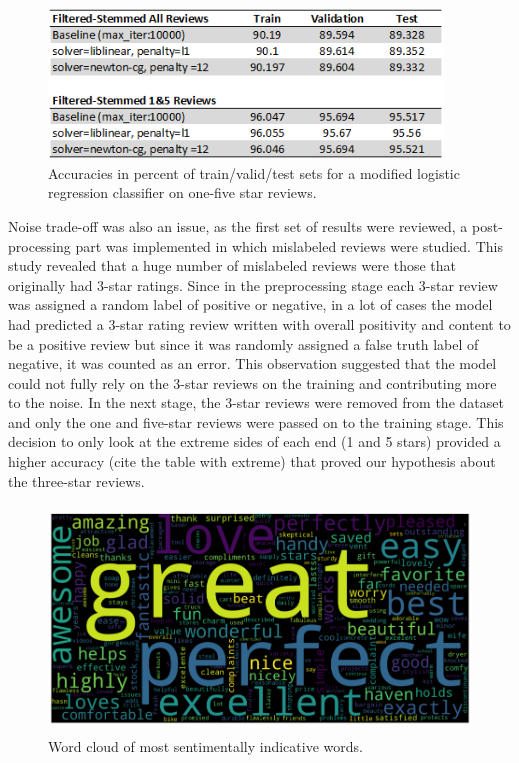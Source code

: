 \documentclass[conference , 11pt]{IEEEtran}
\begin{document}
\begin{figure}[htbp]
\centerline{\includegraphics[width=\columnwidth , height=4cm]{one-five-predictions.png}}
\caption{Accuracies in percent of train/valid/test sets for a modified logistic regression classifier on one-five star reviews.}
\label{fig} 
	
\end{figure}
\FloatBarrier
Noise trade-off was also an issue, as the first set of results were reviewed, a post-processing part was implemented in which mislabeled reviews were studied. This study revealed that a huge number of mislabeled reviews were those that originally had 3-star ratings. Since in the preprocessing stage each 3-star review was assigned a random label of positive or negative, in a lot of cases the model had predicted a 3-star rating review written with overall positivity and content to be a positive review but since it was randomly assigned a false truth label of negative, it was counted as an error. This observation suggested that the model could not fully rely on the 3-star reviews on the training and contributing more to the noise. In the next stage, the 3-star reviews were removed from the dataset and only the one and five-star reviews were passed on to the training stage. This decision to only look at the extreme sides of each end (1 and 5 stars) provided a higher accuracy (cite the table with extreme) that proved our hypothesis about the three-star reviews.

\begin{figure}[htbp]
\centerline{\includegraphics[width=\columnwidth , height=6cm]{word-cloud.png}}
\caption{Word cloud of most sentimentally indicative words.}
\label{fig}
\end{figure}
\FloatBarrier
\end{document}
